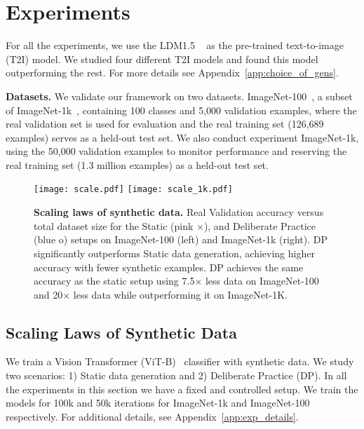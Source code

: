 \section{Experiments}\label{sec:exp}
For all the experiments, we use the LDM1.5 ~\citep{rombach2022high} as the
pre-trained text-to-image (T2I) model. We studied four  different T2I models and found this model outperforming the rest. For more details see Appendix~\ref{app:choice_of_gens}.

\textbf{Datasets.}
We validate our framework on two datasets. ImageNet-100~\citep{tian2020contrastive, sariyildiz2023fake}, a subset of ImageNet-1k~\citep{deng2009imagenet}, containing 100 classes and 5,000 validation examples, where the real validation set is used for evaluation and the real training set (126,689 examples) serves as a held-out test set.
We also conduct experiment ImageNet-1k, using the 50,000 validation examples to monitor performance and reserving the real training set (1.3 million examples) as a held-out test set.

\begin{figure*}
\centering
    \texttt{[image: scale.pdf]}
    \hspace{0mm}
        \texttt{[image: scale\_1k.pdf]}
    \caption{\textbf{Scaling laws of synthetic data.} 
        Real Validation accuracy versus total dataset size  for the Static (pink $\times$), and Deliberate Practice (blue o) setups on ImageNet-100 (left) and ImageNet-1k (right). DP significantly outperforms Static data generation, achieving higher  accuracy with fewer synthetic examples. DP achieves the same accuracy as the static setup using 7.5$\times$ less data on ImageNet-100 and 20$\times$ less data while outperforming it on ImageNet-1K.
        }
\label{fig:scaling-laws}
\end{figure*}

\subsection{Scaling Laws of Synthetic Data}
We train a Vision Transformer (ViT-B)~\citep{dosovitskiy2020image} classifier with synthetic data. We study two scenarios: 1) Static data generation and 2) Deliberate Practice (DP). In all the experiments in this section we have a fixed and controlled setup. We train the models for 100k and 50k iterations for ImageNet-1k and ImageNet-100 respectively. For additional details, see Appendix~\ref{app:exp_details}.

